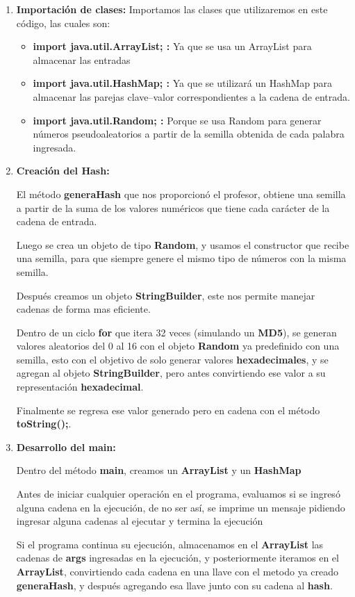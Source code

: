\documentclass[letterpaper,12pt]{article}
\begin{document}
\begin{enumerate}

    \item \textbf {Importación de clases:}
    Importamos las clases que utilizaremos en este código, las cuales son:
    \begin{itemize}
        \item \textbf{import java.util.ArrayList; :} 
        Ya que se usa un ArrayList para almacenar las entradas
        \item \textbf{import java.util.HashMap; :} 
        Ya que se utilizará un HashMap para almacenar las parejas clave–valor correspondientes a la cadena de entrada.
        \item \textbf{import java.util.Random; :} 
        Porque se usa Random para generar números pseudoaleatorios a partir de la semilla obtenida de cada palabra ingresada.
    \end{itemize}


    \item \textbf{Creación del Hash:}

   El método \textbf{generaHash} que nos proporcionó el profesor, obtiene una semilla a partir de la suma de los valores numéricos que tiene cada carácter de la cadena de entrada. 
   
   Luego se crea un objeto de tipo \textbf{Random}, y usamos el constructor que recibe una semilla, para que siempre genere el mismo tipo de números con la misma semilla. 

   Después creamos un objeto \textbf{StringBuilder}, este nos permite manejar cadenas de forma mas eficiente.

   Dentro de un ciclo \textbf{for} que itera 32 veces (simulando un \textbf{MD5}), se generan valores aleatorios del 0 al 16 con el objeto \textbf{Random} ya predefinido con una semilla, esto con el objetivo de solo generar valores \textbf{hexadecimales}, y se agregan al objeto \textbf{StringBuilder}, pero antes convirtiendo ese valor a su representación \textbf{hexadecimal}.

   Finalmente se regresa ese valor generado pero en cadena con el método \textbf{toString();}.

   \item \textbf{Desarrollo del main:}

   Dentro del método \textbf{main}, creamos un \textbf{ArrayList} y un \textbf{HashMap} 

   Antes de iniciar cualquier operación en el programa, evaluamos si se ingresó alguna cadena en la ejecución, de no ser así, se imprime un mensaje pidiendo ingresar alguna cadenas al ejecutar y termina la ejecución 
   
   Si el programa continua su ejecución, almacenamos en el \textbf{ArrayList} las cadenas de \textbf{args} ingresadas en la ejecución, y posteriormente iteramos en el \textbf{ArrayList}, convirtiendo cada cadena en una llave con el metodo ya creado \textbf{generaHash}, y después agregando esa llave junto con su cadena al \textbf{hash}.

    \end{enumerate}
\end{document}
